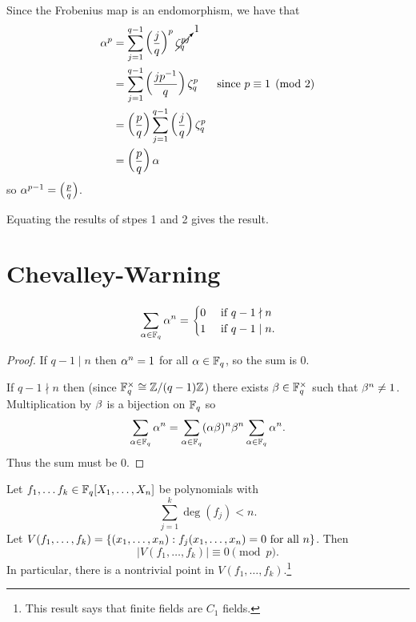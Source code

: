 Since the Frobenius map is an endomorphism, we have that
\begin{align*}
\alpha^p&=\sum_{j=1}^{q-1} \left( {\frac{j}{q}} \right)^p\cancelto{1}{\zeta_q^{pj}}\\
&=\sum_{j=1}^{q-1} \left( {\frac{jp^{-1}}{q}} \right)\zeta_q^p&\text{since }p\equiv 1\pmod 2\\
&=\left( {\frac{p}{q}} \right) \sum_{j=1}^{q-1} \left( {\frac{j}{q}} \right)\zeta_q^p\\
&=\left( {\frac{p}{q}} \right) \alpha
\end{align*}
so $\alpha^{p-1}=\left( {\frac{p}{q}} \right)$.

Equating the results of stpes 1 and 2 gives the result.
\section{Chevalley-Warning}\label{chevalley-warning}
\begin{lem}\label{ff-power-sum}
\[
\sum_{\alpha\in \mathbb{F}_q} \alpha^n=\begin{cases}
0&\text{ if }q-1\nmid n\\
1&\text{ if }q-1\mid n.
\end{cases}
\]
\end{lem}
\begin{proof}
If $q-1\mid n$ then $\alpha^n=1$ for all $\alpha\in \mathbb{F}_q$, so the sum is 0.

If $q-1\nmid n$ then (since $\mathbb{F}_q^{\times}\cong \mathbb{Z}/(q-1)\mathbb{Z}$) there exists $\beta\in \mathbb{F}_q^{\times}$ such that $\beta^n\ne 1$. Multiplication by $\beta$ is a bijection on $\mathbb{F}_q$ so
\[
\sum_{\alpha\in \mathbb{F}_q}\alpha^n=\sum_{\alpha\in \mathbb{F}_q}(\alpha\beta)^n
\beta^n\sum_{\alpha\in \mathbb{F}_q}\alpha^n.
\]
Thus the sum must be 0.
\end{proof}
\begin{thm}\label{chevalley-warning}
Let $f_1,\ldots f_k\in \mathbb{F}_q[X_1,\ldots, X_n]$ be polynomials with
\[
\sum_{j=1}^k \deg(f_j)<n.
\]
Let $V(f_1,\ldots, f_k)=\left\{{(x_1,\ldots, x_n)}:{f_j(x_1,\ldots, x_n)=0\text{ for all }n}\right\}$. Then 
\[|V(f_1,\ldots, f_k)|\equiv 0\pmod{p}.\]
In particular, there is a nontrivial point in $V(f_1,\ldots, f_k)$.\footnote{This result says that finite fields are $C_1$ fields.}
\end{thm}
